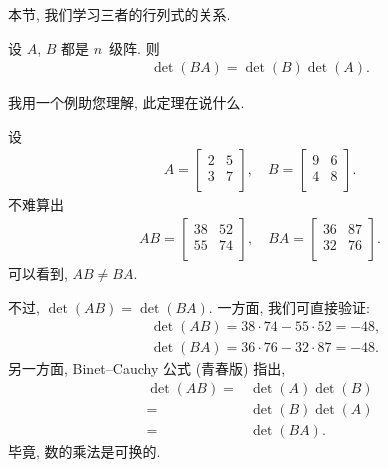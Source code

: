 本节, 我们学习三者的行列式的关系.

\begin{theorem}
    设 \(A\), \(B\) 都是 \(n\)~级阵.
    则
    \begin{align*}
        \det {(BA)} = \det {(B)} \det {(A)}.
    \end{align*}
\end{theorem}

我用一个例助您理解, 此定理在说什么.

\begin{example}
    设
    \begin{align*}
        A = \begin{bmatrix}
                2 & 5 \\
                3 & 7 \\
            \end{bmatrix},
        \quad
        B = \begin{bmatrix}
                9 & 6 \\
                4 & 8 \\
            \end{bmatrix}.
    \end{align*}
    不难算出
    \begin{align*}
        AB
        = \begin{bmatrix}
              38 & 52 \\
              55 & 74 \\
          \end{bmatrix},
        \quad
        BA
        = \begin{bmatrix}
              36 & 87 \\
              32 & 76 \\
          \end{bmatrix}.
    \end{align*}
    可以看到, \(AB \neq BA\).

    不过, \(\det {(AB)} = \det {(BA)}\).
    一方面, 我们可直接验证:
    \begin{align*}
         & \det {(AB)} = 38 \cdot 74 - 55 \cdot 52 = -48, \\
         & \det {(BA)} = 36 \cdot 76 - 32 \cdot 87 = -48.
    \end{align*}
    另一方面, Binet--Cauchy 公式 (青春版) 指出,
    \begin{align*}
        \det {(AB)}
        = {} & \det {(A)} \det {(B)} \\
        = {} & \det {(B)} \det {(A)} \\
        = {} & \det {(BA)}.
    \end{align*}
    毕竟, 数的乘法是可换的.
\end{example}


